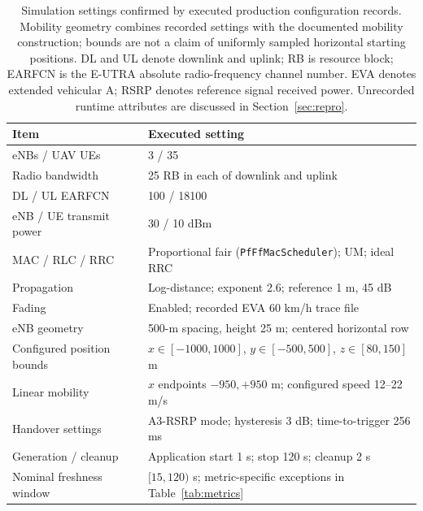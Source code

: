 \begin{table}[htbp]
\caption{Simulation settings confirmed by executed production configuration records. Mobility geometry combines recorded settings with the documented mobility construction; bounds are not a claim of uniformly sampled horizontal starting positions. DL and UL denote downlink and uplink; RB is resource block; EARFCN is the E-UTRA absolute radio-frequency channel number. EVA denotes extended vehicular A; RSRP denotes reference signal received power. Unrecorded runtime attributes are discussed in Section~\ref{sec:repro}.}\label{tab:config}
\small\begin{tabularx}{\textwidth}{lX}\toprule
Item & Executed setting \\\midrule
eNBs / UAV UEs & 3 / 35 \\
Radio bandwidth & 25 RB in each of downlink and uplink \\
DL / UL EARFCN & 100 / 18100 \\
eNB / UE transmit power & 30 / 10 dBm \\
MAC / RLC / RRC & Proportional fair (\texttt{PfFfMacScheduler}); UM; ideal RRC \\
Propagation & Log-distance; exponent 2.6; reference 1 m, 45 dB \\
Fading & Enabled; recorded EVA 60 km/h trace file \\
eNB geometry & 500-m spacing, height 25 m; centered horizontal row \\
Configured position bounds & $x\in[-1000,1000]$, $y\in[-500,500]$, $z\in[80,150]$ m \\
Linear mobility & $x$ endpoints $-950,+950$ m; configured speed 12--22 m/s \\
Handover settings & A3-RSRP mode; hysteresis 3 dB; time-to-trigger 256 ms \\
Generation / cleanup & Application start 1 s; stop 120 s; cleanup 2 s \\
Nominal freshness window & $[15,120)$ s; metric-specific exceptions in Table~\ref{tab:metrics} \\
\bottomrule\end{tabularx}
\end{table}
